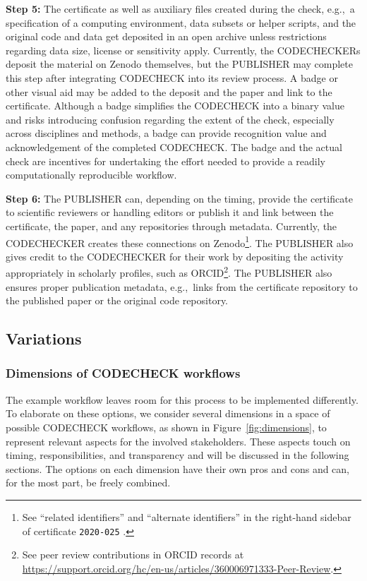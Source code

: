 \documentclass[12pt]{article}
\begin{document}
\textbf{Step 5:} The certificate as well as auxiliary files created
during the check, e.g.,~a specification of a computing environment, data 
subsets or helper scripts, and the original code and data get deposited in
an open archive unless restrictions regarding data size, license or 
sensitivity apply.
Currently, the CODECHECKERs deposit the material on Zenodo themselves, but the PUBLISHER may complete this step after integrating CODECHECK into its review process.
A badge or other visual aid may be added to the deposit and the paper and
link to the certificate.
Although a badge simplifies the CODECHECK into a binary value and risks introducing confusion regarding the extent of the check, especially across disciplines and methods, a badge can provide recognition value and acknowledgement of the completed CODECHECK.
The badge and the actual check are incentives for undertaking the effort needed to provide a readily computationally reproducible workflow.

\textbf{Step 6:} The PUBLISHER can, depending on the timing, provide the
certificate to scientific reviewers or handling editors or publish it
and link between the certificate, the paper, and any repositories 
through metadata. Currently, the CODECHECKER creates these connections on
Zenodo\footnote{
See ``related identifiers'' and ``alternate identifiers'' in the right-hand
sidebar of certificate \texttt{2020-025} \cite{cert-2020-025}.}.
The PUBLISHER also gives credit to the CODECHECKER for their work by depositing
the activity appropriately in scholarly profiles, such as ORCID\footnote{
See peer review contributions in ORCID records at
\url{https://support.orcid.org/hc/en-us/articles/360006971333-Peer-Review}.}.
The PUBLISHER also ensures proper publication metadata, e.g.,~links from the 
certificate repository to the published paper or the original code repository.

\newpage

\subsection*{Variations}\label{variations}

\subsubsection*{Dimensions of CODECHECK workflows}\label{dimensions-of-workflows}

The example workflow leaves room for this process to be implemented differently.
To elaborate on these options, we consider several dimensions in a space of possible CODECHECK workflows, as shown in Figure~\ref{fig:dimensions}, to represent relevant aspects for the involved stakeholders.
These aspects touch on timing, responsibilities, and 
transparency and will be discussed in the following sections.
The options on each dimension have their own pros and cons and can,
for the most part, be freely combined.
\end{document}
